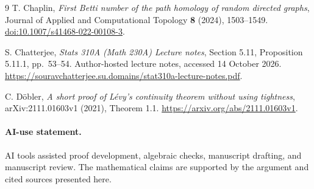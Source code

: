 \documentclass[11pt]{article}
\begin{document}
\begin{thebibliography}{9}
T. Chaplin, \emph{First Betti number of the path homology of random directed graphs}, Journal of Applied and Computational Topology \textbf{8} (2024), 1503--1549.
\href{https://doi.org/10.1007/s41468-022-00108-3}{doi:10.1007/s41468-022-00108-3}.

S. Chatterjee, \emph{Stats 310A (Math 230A) Lecture notes}, Section 5.11, Proposition 5.11.1, pp.~53--54. Author-hosted lecture notes, accessed 14 October 2026.
\url{https://souravchatterjee.su.domains/stat310a-lecture-notes.pdf}.

C. D\"obler, \emph{A short proof of L\'evy's continuity theorem without using tightness}, arXiv:2111.01603v1 (2021), Theorem 1.1.
\url{https://arxiv.org/abs/2111.01603v1}.
\end{thebibliography}

\paragraph{AI-use statement.}
AI tools assisted proof development, algebraic checks, manuscript drafting, and manuscript review. The mathematical claims are supported by the argument and cited sources presented here.
\end{document}
